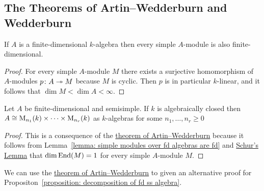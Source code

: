 \subsection*{The Theorems of Artin--Wedderburn and Wedderburn}


\begin{lemma}
  \label{lemma: simple modules over fd algebras are fd}
  If $A$ is a finite-dimensional $k$-algebra then every simple $A$-module is also finite-dimensional.
\end{lemma}


\begin{proof}
  For every simple $A$-module $M$ there exists a surjective homomorphism of $A$-modules $p \colon A \twoheadrightarrow M$ because $M$ is cyclic.
  Then $p$ is in particular $k$-linear, and it follows that $\dim M < \dim A < \infty$.
\end{proof}


\begin{corollary}
  \label{corollary: semisimple algebra product of matrix algebras}
  Let $A$ be finite-dimensional and semisimple.
  If $k$ is algebraically closed then $A \cong \operatorname{M}_{n_1}(k) \times \dotsm \times \operatorname{M}_{n_r}(k)$ as $k$-algebras for some $n_1, \dotsc, n_r \geq 0$
\end{corollary}


\begin{proof}
  This is a consequence of the \hyperref[theorem: artin wedderburn theorem]{theorem of Artin--Wedderburn} because it follows from Lemma~\ref{lemma: simple modules over fd algebras are fd} and \hyperref[proposition: schurs lemma for modules]{Schur’s Lemma} that $\dim \operatorname{End}(M) = 1$ for every simple $A$-module $M$.
\end{proof}


\begin{fluff}
  We can use the \hyperref[theorem: artin wedderburn theorem]{theorem of Artin--Wedderburn} to given an alternative proof for Propositon~\ref{proposition: decomposition of fd ss algebra}.
\end{fluff}


